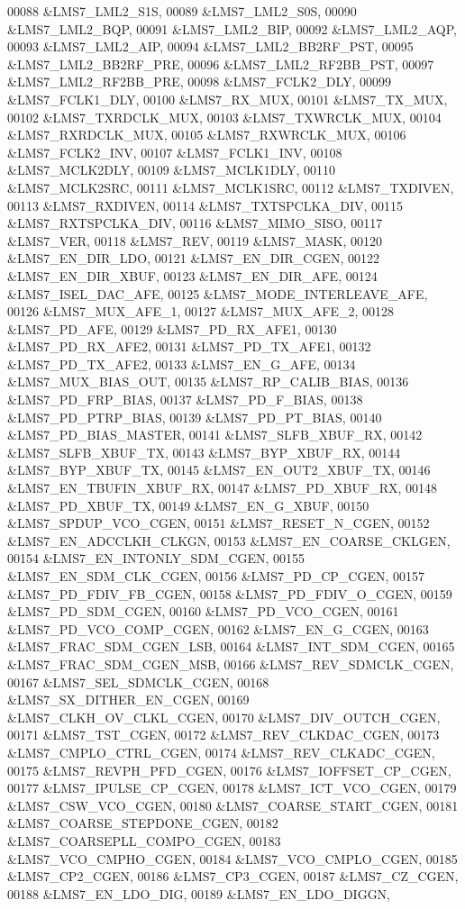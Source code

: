 \begin{DoxyCode}
00088 &LMS7_LML2_S1S,
00089 &LMS7_LML2_S0S,
00090 &LMS7_LML2_BQP,
00091 &LMS7_LML2_BIP,
00092 &LMS7_LML2_AQP,
00093 &LMS7_LML2_AIP,
00094 &LMS7_LML2_BB2RF_PST,
00095 &LMS7_LML2_BB2RF_PRE,
00096 &LMS7_LML2_RF2BB_PST,
00097 &LMS7_LML2_RF2BB_PRE,
00098 &LMS7_FCLK2_DLY,
00099 &LMS7_FCLK1_DLY,
00100 &LMS7_RX_MUX,
00101 &LMS7_TX_MUX,
00102 &LMS7_TXRDCLK_MUX,
00103 &LMS7_TXWRCLK_MUX,
00104 &LMS7_RXRDCLK_MUX,
00105 &LMS7_RXWRCLK_MUX,
00106 &LMS7_FCLK2_INV,
00107 &LMS7_FCLK1_INV,
00108 &LMS7_MCLK2DLY,
00109 &LMS7_MCLK1DLY,
00110 &LMS7_MCLK2SRC,
00111 &LMS7_MCLK1SRC,
00112 &LMS7_TXDIVEN,
00113 &LMS7_RXDIVEN,
00114 &LMS7_TXTSPCLKA_DIV,
00115 &LMS7_RXTSPCLKA_DIV,
00116 &LMS7_MIMO_SISO,
00117 &LMS7_VER,
00118 &LMS7_REV,
00119 &LMS7_MASK,
00120 &LMS7_EN_DIR_LDO,
00121 &LMS7_EN_DIR_CGEN,
00122 &LMS7_EN_DIR_XBUF,
00123 &LMS7_EN_DIR_AFE,
00124 &LMS7_ISEL_DAC_AFE,
00125 &LMS7_MODE_INTERLEAVE_AFE,
00126 &LMS7_MUX_AFE_1,
00127 &LMS7_MUX_AFE_2,
00128 &LMS7_PD_AFE,
00129 &LMS7_PD_RX_AFE1,
00130 &LMS7_PD_RX_AFE2,
00131 &LMS7_PD_TX_AFE1,
00132 &LMS7_PD_TX_AFE2,
00133 &LMS7_EN_G_AFE,
00134 &LMS7_MUX_BIAS_OUT,
00135 &LMS7_RP_CALIB_BIAS,
00136 &LMS7_PD_FRP_BIAS,
00137 &LMS7_PD_F_BIAS,
00138 &LMS7_PD_PTRP_BIAS,
00139 &LMS7_PD_PT_BIAS,
00140 &LMS7_PD_BIAS_MASTER,
00141 &LMS7_SLFB_XBUF_RX,
00142 &LMS7_SLFB_XBUF_TX,
00143 &LMS7_BYP_XBUF_RX,
00144 &LMS7_BYP_XBUF_TX,
00145 &LMS7_EN_OUT2_XBUF_TX,
00146 &LMS7_EN_TBUFIN_XBUF_RX,
00147 &LMS7_PD_XBUF_RX,
00148 &LMS7_PD_XBUF_TX,
00149 &LMS7_EN_G_XBUF,
00150 &LMS7_SPDUP_VCO_CGEN,
00151 &LMS7_RESET_N_CGEN,
00152 &LMS7_EN_ADCCLKH_CLKGN,
00153 &LMS7_EN_COARSE_CKLGEN,
00154 &LMS7_EN_INTONLY_SDM_CGEN,
00155 &LMS7_EN_SDM_CLK_CGEN,
00156 &LMS7_PD_CP_CGEN,
00157 &LMS7_PD_FDIV_FB_CGEN,
00158 &LMS7_PD_FDIV_O_CGEN,
00159 &LMS7_PD_SDM_CGEN,
00160 &LMS7_PD_VCO_CGEN,
00161 &LMS7_PD_VCO_COMP_CGEN,
00162 &LMS7_EN_G_CGEN,
00163 &LMS7_FRAC_SDM_CGEN_LSB,
00164 &LMS7_INT_SDM_CGEN,
00165 &LMS7_FRAC_SDM_CGEN_MSB,
00166 &LMS7_REV_SDMCLK_CGEN,
00167 &LMS7_SEL_SDMCLK_CGEN,
00168 &LMS7_SX_DITHER_EN_CGEN,
00169 &LMS7_CLKH_OV_CLKL_CGEN,
00170 &LMS7_DIV_OUTCH_CGEN,
00171 &LMS7_TST_CGEN,
00172 &LMS7_REV_CLKDAC_CGEN,
00173 &LMS7_CMPLO_CTRL_CGEN,
00174 &LMS7_REV_CLKADC_CGEN,
00175 &LMS7_REVPH_PFD_CGEN,
00176 &LMS7_IOFFSET_CP_CGEN,
00177 &LMS7_IPULSE_CP_CGEN,
00178 &LMS7_ICT_VCO_CGEN,
00179 &LMS7_CSW_VCO_CGEN,
00180 &LMS7_COARSE_START_CGEN,
00181 &LMS7_COARSE_STEPDONE_CGEN,
00182 &LMS7_COARSEPLL_COMPO_CGEN,
00183 &LMS7_VCO_CMPHO_CGEN,
00184 &LMS7_VCO_CMPLO_CGEN,
00185 &LMS7_CP2_CGEN,
00186 &LMS7_CP3_CGEN,
00187 &LMS7_CZ_CGEN,
00188 &LMS7_EN_LDO_DIG,
00189 &LMS7_EN_LDO_DIGGN,

\end{DoxyCode}
